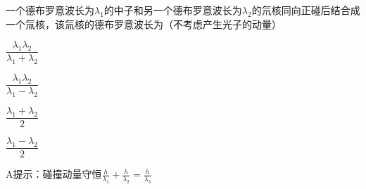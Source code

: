 一个德布罗意波长为\(\lambda_1\)的中子和另一个德布罗意波长为\(\lambda_2\)的氘核同向正碰后结合成一个氚核，该氚核的德布罗意波长为（不考虑产生光子的动量）\paren[A]
\begin{choices}
	\item \(\dfrac{\lambda_1\lambda_2}{\lambda_1 +\lambda_2}\)
	\item \(\dfrac{\lambda_1\lambda_2}{\lambda_1 -\lambda_2}\)
	\item \(\dfrac{\lambda_1 +\lambda_2}{2}\)
	\item \(\dfrac{\lambda_1 -\lambda_2}{2}\)
\end{choices}
\begin{answer}
    A\qquad 提示：碰撞动量守恒\(\frac{h}{\lambda_1} + \frac{h}{\lambda_2} = \frac{h}{\lambda_3}\)
\end{answer}
